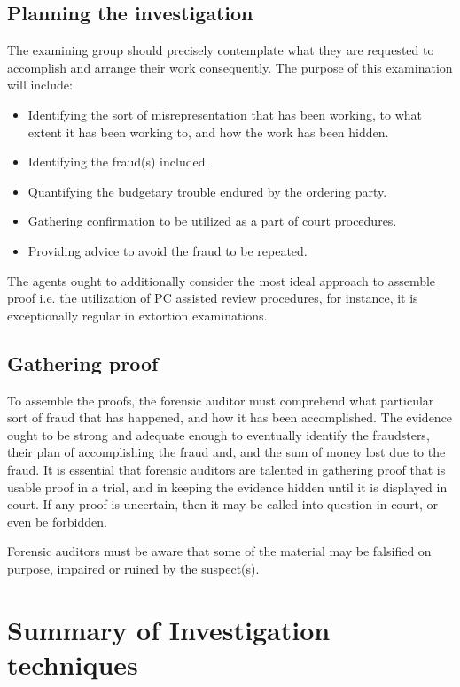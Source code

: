 \subsection {Planning the investigation}

The examining group should precisely contemplate what they are requested to accomplish and arrange their work consequently. The purpose of this examination will include: 

\begin{itemize}
\item Identifying the sort of misrepresentation that has been working, to what extent it has been working to, and how the work has been hidden.
\item Identifying the fraud(s) included.
\item Quantifying the budgetary trouble endured by the ordering party.
\item Gathering confirmation to be utilized as a part of court procedures. 
\item Providing advice to avoid the fraud to be repeated.
\end{itemize}


The agents ought to additionally consider the most ideal approach to assemble proof i.e. the utilization of PC assisted review procedures, for instance, it is exceptionally regular in extortion examinations.

\subsection{Gathering proof}

To assemble the proofs, the forensic auditor must comprehend what particular sort of fraud that has happened, and how it has been accomplished. The evidence ought to be strong and adequate enough to eventually identify the fraudsters, their plan of accomplishing the fraud and, and the sum of money lost due to the fraud. It is essential that forensic auditors are talented in gathering proof that is usable proof in a trial, and in keeping the evidence hidden until it is displayed in court. If any proof is uncertain, then it may be called into question in court, or even be forbidden. 

Forensic auditors must be aware that some of the material may be falsified on purpose, impaired or ruined by the suspect(s).

\section{Summary of Investigation techniques}

